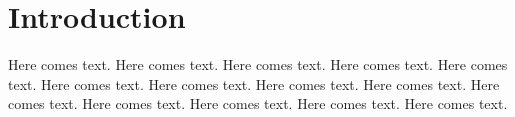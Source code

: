 \chapter{Introduction}

Here comes text. Here comes text. Here comes text. Here comes text. Here comes text. Here comes text. Here comes text. Here comes text. Here comes text. Here comes text. Here comes text. Here comes text. Here comes text. Here comes text.